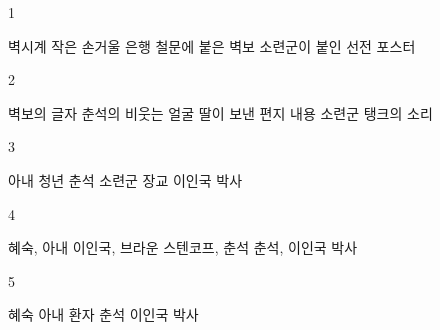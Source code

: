 \documentclass[fs9,seriesRus]{korfarm-base}
\begin{document}
\kfActivityBg \par{}
\par{}\par\nopagebreak[4]\smallskip\nopagebreak[4]
\kfBeginMC
\begin{kfSentenceUnit}{1}{}
\begin{kfChoices}
\kfChoice 벽시계
\kfChoice 작은 손거울
\kfChoice 은행 철문에 붙은 벽보
\kfChoice 소련군이 붙인 선전 포스터
\end{kfChoices}
\end{kfSentenceUnit}

\begin{kfSentenceUnit}{2}{}
\begin{kfChoices}
\kfChoice 벽보의 글자
\kfChoice 춘석의 비웃는 얼굴
\kfChoice 딸이 보낸 편지 내용
\kfChoice 소련군 탱크의 소리
\end{kfChoices}
\end{kfSentenceUnit}

\begin{kfSentenceUnit}{3}{}
\begin{kfChoices}
\kfChoice 아내
\kfChoice 청년 춘석
\kfChoice 소련군 장교
\kfChoice 이인국 박사
\end{kfChoices}
\end{kfSentenceUnit}

\begin{kfSentenceUnit}{4}{}
\begin{kfChoices}
\kfChoice 혜숙, 아내
\kfChoice 이인국, 브라운
\kfChoice 스텐코프, 춘석
\kfChoice 춘석, 이인국 박사
\end{kfChoices}
\end{kfSentenceUnit}

\begin{kfSentenceUnit}{5}{}
\begin{kfChoices}
\kfChoice 혜숙
\kfChoice 아내
\kfChoice 환자 춘석
\kfChoice 이인국 박사
\end{kfChoices}
\end{kfSentenceUnit}
\end{document}
